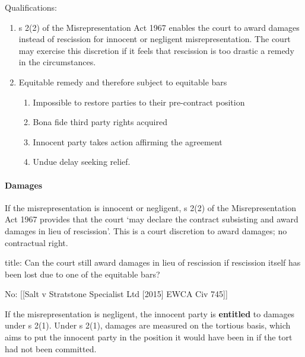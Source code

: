 \documentclass[
]{article}
\newenvironment{Shaded}{}{}
\newcommand{\NormalTok}[1]{#1}
\providecommand{\tightlist}{%
  \setlength{\itemsep}{0pt}\setlength{\parskip}{0pt}}
\begin{document}
Qualifications:

\begin{enumerate}
\def\labelenumi{\arabic{enumi}.}
\tightlist
\item
  s 2(2) of the Misrepresentation Act 1967 enables the court to award
  damages instead of rescission for innocent or negligent
  misrepresentation. The court may exercise this discretion if it feels
  that rescission is too drastic a remedy in the circumstances.
\item
  Equitable remedy and therefore subject to equitable bars

  \begin{enumerate}
  \def\labelenumii{\arabic{enumii}.}
  \tightlist
  \item
    Impossible to restore parties to their pre-contract position
  \item
    Bona fide third party rights acquired
  \item
    Innocent party takes action affirming the agreement
  \item
    Undue delay seeking relief.
  \end{enumerate}
\end{enumerate}

\hypertarget{damages}{%
\paragraph{Damages}\label{damages}}

If the misrepresentation is innocent or negligent, s 2(2) of the
Misrepresentation Act 1967 provides that the court `may declare the
contract subsisting and award damages in lieu of rescission'. This is a
court discretion to award damages; no contractual right.

\begin{Shaded}
\begin{Highlighting}[]
\NormalTok{title: Can the court still award damages in lieu of rescission if rescission itself has been lost due to one of the equitable bars?}

\NormalTok{No: [[Salt v Stratstone Specialist Ltd [2015] EWCA Civ 745]]}
\end{Highlighting}
\end{Shaded}

If the misrepresentation is negligent, the innocent party is
\textbf{entitled} to damages under s 2(1). Under s 2(1), damages are
measured on the tortious basis, which aims to put the innocent party in
the position it would have been in if the tort had not been committed.
\end{document}

